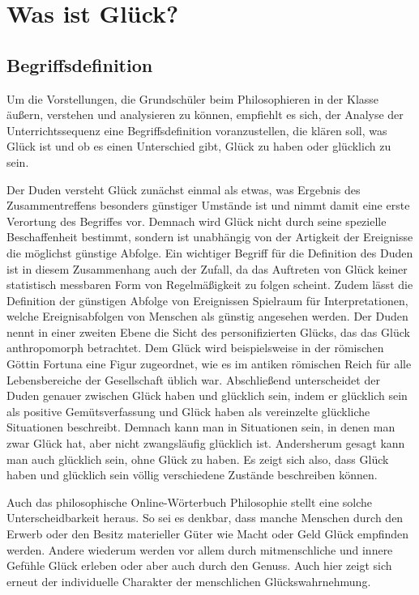 \section{Was ist Glück?}
\subsection{Begriffsdefinition}

Um die Vorstellungen, die Grundschüler beim Philosophieren in der Klasse äußern, verstehen und analysieren zu können, empfiehlt es sich, der Analyse der Unterrichtssequenz eine Begriffsdefinition voranzustellen, die klären soll, was Glück ist und ob es einen Unterschied gibt, Glück zu \glqq haben\grqq{} oder \glqq glücklich\grqq{} zu sein.

Der Duden versteht Glück zunächst einmal als \glqq etwas, was Ergebnis des Zusammentreffens besonders günstiger Umstände ist\grqq{} \cite{D16} und nimmt damit eine erste Verortung des Begriffes vor. 
Demnach wird Glück nicht durch seine spezielle Beschaffenheit bestimmt, sondern ist unabhängig von der Artigkeit der Ereignisse die möglichst günstige Abfolge.
 Ein wichtiger Begriff für die Definition des Duden ist in diesem Zusammenhang auch der Zufall, da das Auftreten von Glück keiner statistisch messbaren Form von Regelmäßigkeit zu folgen scheint. 
 Zudem lässt die Definition der \glqq günstigen Abfolge von Ereignissen\grqq{} Spielraum für Interpretationen, welche Ereignisabfolgen von Menschen als günstig angesehen werden.  
 Der Duden nennt in einer zweiten Ebene die Sicht des personifizierten Glücks, das das Glück anthropomorph betrachtet. 
 Dem Glück wird beispielsweise in der römischen Göttin Fortuna eine Figur zugeordnet, wie es im antiken römischen Reich für alle Lebensbereiche der Gesellschaft üblich war. 
 Abschließend unterscheidet der Duden genauer zwischen Glück haben und glücklich sein, indem er \glqq glücklich sein\grqq{} als positive Gemütsverfassung und \glqq Glück haben\grqq{} als vereinzelte glückliche Situationen beschreibt\cite{D16}.
  Demnach kann man in Situationen sein, in denen man zwar Glück hat, aber nicht zwangsläufig glücklich ist. 
 Andersherum gesagt kann man auch glücklich sein, ohne Glück zu haben. 
 Es zeigt sich also, dass \glqq Glück haben\grqq{} und \glqq glücklich sein\grqq{} völlig verschiedene Zustände beschreiben können. 
 
Auch das philosophische Online-Wörterbuch Philosophie stellt eine solche Unterscheidbarkeit heraus. 
So sei es denkbar, dass manche Menschen durch den Erwerb oder den Besitz materieller Güter wie Macht oder Geld Glück empfinden werden. 
Andere wiederum werden vor allem durch mitmenschliche und innere Gefühle Glück erleben oder aber auch durch den Genuss\cite{GT16}. 
Auch hier zeigt sich erneut der individuelle Charakter der menschlichen Glückswahrnehmung. 


